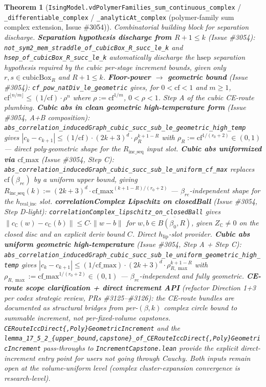 \documentclass[a4paper,11pt]{article}
\newtheorem{theorem}{Theorem}
\begin{document}
\begin{theorem}[\texttt{IsingModel.vdPolymerFamilies\_sum\_continuous\_complex} /
\texttt{\_differentiable\_complex} / \texttt{\_analyticAt\_complex} (polymer-family sum
complex extension, Issue \#3054)]
Combinatorial building block for separation discharge.
\textbf{Separation hypothesis discharge from \(R + 1 \le k\)} (Issue \#3054):
\texttt{not\_sym2\_mem\_straddle\_of\_cubicBox\_R\_succ\_le\_k} and
\texttt{hsep\_of\_cubicBox\_R\_succ\_le\_k} automatically discharge the
\(\mathrm{hsep}\) separation hypothesis required by the cubic per-stage
increment bounds, given only \(r, s \in \mathrm{cubicBox}_R\) and \(R + 1 \le k\).
\textbf{Floor-power \(\to\) geometric bound} (Issue \#3054):
\texttt{cf\_pow\_natDiv\_le\_geometric} gives, for \(0 < \mathrm{cf} < 1\)
and \(m \ge 1\), \(\mathrm{cf}^{\lfloor n/m \rfloor} \le (1/\mathrm{cf}) \cdot \rho^n\)
where \(\rho := \mathrm{cf}^{1/m}\), \(0 < \rho < 1\).
Step A of the cubic CE-route plumbing.
\textbf{Cubic abs in clean geometric high-temperature form} (Issue \#3054, A+B composition):
\texttt{abs\_correlation\_inducedGraph\_cubic\_succ\_sub\_le\_geometric\_high\_temp}
gives \(|c_k - c_{k+1}| \le (1/\mathrm{cf}) \cdot (2k+3)^d \cdot \rho_R^{k+1-R}\)
with \(\rho_R := \mathrm{cf}^{1/(r_0+2)} \in (0, 1)\) --- direct poly\(\cdot\)geometric
shape for the \(R_{\mathrm{inc\_seq}}\) input slot.
\textbf{Cubic abs uniformized via \(\mathrm{cf\_max}\)} (Issue \#3054, Step C):
\texttt{abs\_correlation\_inducedGraph\_cubic\_succ\_sub\_le\_uniform\_cf\_max}
replaces \(\mathrm{cf}(\beta_{re})\) by a uniform upper bound, giving
\(R_{\mathrm{inc\_seq}}(k) := (2k+3)^d \cdot \mathrm{cf\_max}^{(k+1-R)/(r_0+2)}\)
--- \(\beta_{re}\)-independent shape for the \(h_{\mathrm{real\_inc}}\) slot.
\textbf{correlationComplex Lipschitz on closedBall} (Issue \#3054, Step D-light):
\texttt{correlationComplex\_lipschitz\_on\_closedBall} gives
\(\|c_{\mathbb{C}}(w) - c_{\mathbb{C}}(b)\| \le C \cdot \|w - b\|\) for
\(w, b \in \overline{B(\beta_0, R)}\), given \(Z_{\mathbb{C}} \ne 0\) on the
closed disc and an explicit deriv bound \(C\). Direct
\(h_{\mathrm{lip}}\)-slot provider.
\textbf{Cubic abs uniform geometric high-temperature} (Issue \#3054, Step A + Step C):
\texttt{abs\_correlation\_inducedGraph\_cubic\_succ\_sub\_le\_uniform\_geometric\_high\_temp}
gives \(|c_k - c_{k+1}| \le (1/\mathrm{cf\_max}) \cdot (2k+3)^d \cdot \rho_{R,\max}^{k+1-R}\)
with \(\rho_{R,\max} := \mathrm{cf\_max}^{1/(r_0+2)} \in (0, 1)\)
--- \(\beta_{re}\)-independent and fully geometric.
\textbf{CE-route scope clarification + direct increment API}
(refactor Direction 1+3 per codex strategic review, PRs \#3125--\#3126):
the CE-route bundles are documented as structural bridges from per-\((\beta, k)\)
complex circle bound to summable increment, not per-fixed-volume capstones.
\texttt{CERouteIccDirect\{,Poly\}GeometricIncrement} and the
\texttt{lemma\_17\_5\_2\_\{upper\_bound,capstone\}\_of\_CERouteIccDirect\{,Poly\}GeometricIncrement}
pass-throughs to \texttt{IncrementCapstone.lean} provide the explicit
direct-increment entry point for users not going through Cauchy.
Both inputs remain open at the volume-uniform level (complex cluster-expansion
convergence is research-level).
\end{theorem}
\end{document}

